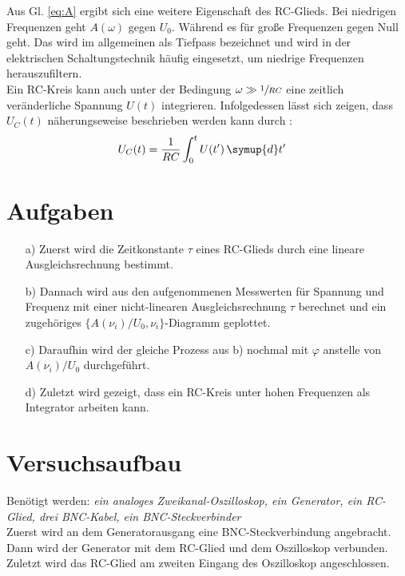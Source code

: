   Aus Gl. \eqref{eq:A} ergibt sich eine weitere Eigenschaft des RC-Glieds. Bei niedrigen 
  Frequenzen geht $A(\omega)$ gegen $U_0$. Während es für große Frequenzen
  gegen Null geht.
  Das wird im allgemeinen als Tiefpass bezeichnet und  wird in der 
  elektrischen Schaltungstechnik häufig eingesetzt, um niedrige Frequenzen
  herauszufiltern.\\
  Ein RC-Kreis kann auch unter der Bedingung $\omega \gg \sfrac{1}{RC}$ eine 
  zeitlich veränderliche Spannung $U(t)$ integrieren. Infolgedessen lässt sich 
  zeigen, dass $U_C(t)$ näherungseweise beschrieben werden kann durch \cite{V353}:
  \begin{align}
    U_C(t) &= \frac{1}{RC} \int_0^t{U(t') \, \symup{d}t'}\label{eq:int}
  \end{align}


\section{Aufgaben}\justifying

 \begin{enumerate}
    \item[a)] Zuerst wird die Zeitkonstante $\tau$ eines RC-Glieds durch 
              eine lineare Ausgleichsrechnung bestimmt.

    \item[b)] Dannach wird aus den aufgenommenen Messwerten für Spannung und 
              Frequenz mit einer nicht-linearen Ausgleichsrechnung $\tau$ berechnet 
              und ein zugehöriges $\{ A(\nu _i)/U_0,\nu _i \}$-Diagramm geplottet.
  
    \item[c)] Daraufhin wird der gleiche Prozess aus b) nochmal mit
              $\varphi$ anstelle von $A(\nu _i)/U_0$ durchgeführt.
  
    \item[d)] Zuletzt wird gezeigt, dass ein RC-Kreis unter hohen Frequenzen 
              als Integrator arbeiten kann.
  \end{enumerate}

  



\section{Versuchsaufbau}\justifying

Benötigt werden: \textit{ein analoges Zweikanal-Oszilloskop, ein Generator, ein RC-Glied, drei BNC-Kabel, ein BNC-Steckverbinder }\\
Zuerst wird an dem Generatorausgang eine BNC-Steckverbindung angebracht. 
Dann wird der Generator mit dem RC-Glied und dem Oszilloskop verbunden. \\
Zuletzt wird das RC-Glied am zweiten Eingang des Oszilloskop angeschlossen.

